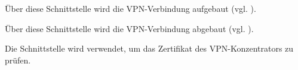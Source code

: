 
Über diese Schnittstelle wird die VPN-Verbindung aufgebaut
(vgl. ).


Über diese Schnittstelle wird die VPN-Verbindung abgebaut (vgl. ).


Die Schnittstelle  wird
verwendet, um das Zertifikat des VPN-Konzentrators zu prüfen.

